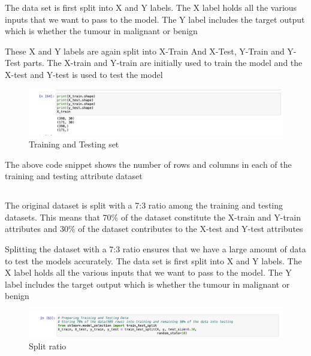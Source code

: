 \documentclass[12pt]{article}
\newcommand{\msize}{\fontsize{14pt}{12pt}\selectfont}
\begin{document}
The data set is first split into X and Y labels. The X label holds all the various inputs that we want to pass to the model. The Y label includes the target output which is whether the tumour in malignant or benign 

These X and Y labels are again split into X-Train And X-Test, Y-Train and Y-Test parts. The X-train and Y-train are initially used to train the model and the X-test and Y-test is used to test the model 
\,
\,
\,
\begin{center}
\begin{figure}[h]
\centerline{\includegraphics[scale=.5]{aft-split.png}}
\caption{Training and Testing set}
\end{figure}
\end{center}

The above code snippet shows the number of rows and columns in each of the training and testing attribute dataset 
\newpage 
\subsection{\msize{\textbf{TRAINING AND TESTING SPLIT}}}
The original dataset is split with a 7:3 ratio among the training and testing datasets. This means that 70\% of the dataset constitute the X-train and Y-train attributes and 30\% of the dataset contributes to the X-test and Y-test attributes 

Splitting the dataset with a 7:3 ratio ensures that we have a large amount of data to test the models accurately. The data set is first split into X and Y labels. The X label holds all the various inputs that we want to pass to the model. The Y label includes the target output which is whether the tumour in malignant or benign 

\begin{center}
\begin{figure}[h]
\centerline{\includegraphics[scale=.5]{splitt.png}}
\caption{Split ratio}
\end{figure}
\end{center}
\end{document}
